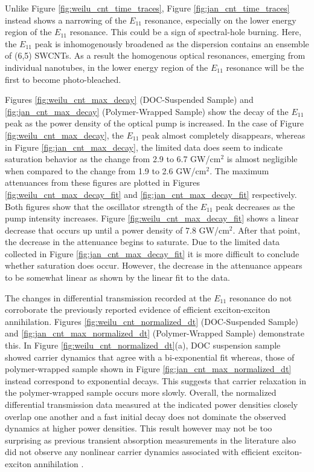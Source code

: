Unlike Figure \ref{fig:weilu_cnt_time_traces}, Figure \ref{fig:jan_cnt_time_traces} instead shows a narrowing of the $E_{11}$ resonance, especially on the lower energy region of the $E_{11}$ resonance. This could be a sign of spectral-hole burning. Here, the $E_{11}$ peak is inhomogenously broadened as the dispersion contains an ensemble of (6,5) SWCNTs. As a result the homogenous optical resonances, emerging from individual nanotubes, in the lower energy region of the $E_{11}$ resonance will be the first to become photo-bleached.

Figures \ref{fig:weilu_cnt_max_decay}  (DOC-Suspended Sample) and \ref{fig:jan_cnt_max_decay} (Polymer-Wrapped Sample) show the decay of the $E_{11}$ peak as the power density of the optical pump is increased. In the case of Figure \ref{fig:weilu_cnt_max_decay}, the $E_{11}$ peak almost completely disappears, whereas in Figure \ref{fig:jan_cnt_max_decay}, the limited data does seem to indicate saturation behavior as the change from 2.9 to 6.7 GW/cm$^2$ is almost negligible when compared to the change from 1.9 to 2.6 GW/cm$^2$. The maximum attenuances from these figures are plotted in Figures \ref{fig:weilu_cnt_max_decay_fit} and \ref{fig:jan_cnt_max_decay_fit} respectively. Both figures show that the oscillator strength of the $E_{11}$ peak decreases as the pump intensity increases. Figure \ref{fig:weilu_cnt_max_decay_fit} shows a linear decrease that occurs up until a power density of 7.8 GW/cm$^2$. After that point, the decrease in the attenuance begins to saturate. Due to the limited data collected in Figure \ref{fig:jan_cnt_max_decay_fit} it is more difficult to conclude whether saturation does occur. However, the decrease in the attenuance appears to be somewhat linear as shown by the linear fit to the data.

The changes in differential transmission recorded at the $E_{11}$ resonance do not corroborate the previously reported evidence of efficient exciton-exciton annihilation. Figures \ref{fig:weilu_cnt_normalized_dt} (DOC-Suspended Sample) and \ref{fig:jan_cnt_max_normalized_dt} (Polymer-Wrapped Sample) demonstrate this. In Figure \ref{fig:weilu_cnt_normalized_dt}(a), DOC suspension sample showed carrier dynamics that agree with a bi-exponential fit whereas, those of polymer-wrapped sample shown in Figure \ref{fig:jan_cnt_max_normalized_dt} instead correspond to exponential decays. This suggests that carrier relaxation in the polymer-wrapped sample occurs more slowly. Overall, the normalized differential transmission data measured at the indicated power densities closely overlap one another and a fast initial decay does not dominate the observed dynamics at higher power densities. This result however may not be too surprising as previous transient absorption measurements in the literature also did not observe any nonlinear carrier dynamics associated with efficient exciton-exciton annihilation \cite{ostojic2004interband, manzoni2005intersubband, ma2005femtosecond, luer2009size}.

